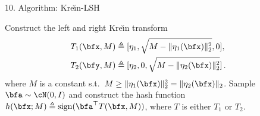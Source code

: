 \documentclass[final]{beamer}
\newcommand{\kr}{Kre\u{\i}n\xspace}
\DeclareMathOperator{\sign}{sign}
\newlength{\sepwid}
\newlength{\onecolwid}
\begin{document}
\begin{frame}[t]
\begin{columns}[t]
\begin{column}{\onecolwid}
\begin{block}{10. Algorithm: \kr-LSH}
\begin{algorithmic}[1]
				\State Construct the left and right \kr transform
				\begin{align*}
				T_1(\bfx,M) \triangleq{} & 
				[\eta_1,\sqrt{M-\|\eta_1(\bfx)\|^2_2},0],\\ T_2(\bfy,M) 
				\triangleq{} &
				[\eta_2,0,\sqrt{M-\|\eta_2(\bfx)\|^2_2}]\,.
				\end{align*}
				where $ M $ is a constant s.t.\ $ M\ge \|\eta_1(\bfx)\|_2^2 = \|\eta_2(\bfx)\|_2
				$.
				\State Sample $\bfa\sim \cN(0,I)$ and construct the hash 
				function 
				$ h(\bfx; M)\triangleq \sign(\bfa^\top T(\bfx, M))$,
				where $T$ is either $ T_1 $ or $ T_2 $.\label{ln:simple-lsh}
			\end{algorithmic}
        \end{block}
\end{column}
 \begin{column}{\sepwid}
 
 \end{column}
		
	\end{columns} %
	
\end{frame} %
\end{document}
